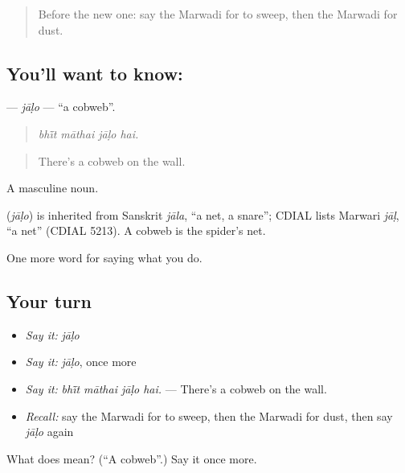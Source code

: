 \begin{quote}
Before the new one: say the Marwadi for to sweep, then the Marwadi for dust.
\end{quote}

\subsection*{You'll want to know: }
\textbf{} — \emph{jāḷo} — \textquotedblleft{}a cobweb\textquotedblright{}.

\begin{quote}
   
\end{quote}

\begin{quote}
\emph{bhī̃t māthai jāḷo hai.}
\end{quote}

\begin{quote}
There's a cobweb on the wall.
\end{quote}

A masculine noun.

\begin{cousinweb}
\textbf{} (\emph{jāḷo}) is inherited from Sanskrit \emph{jāla}, \textquotedblleft{}a net, a snare\textquotedblright{}; CDIAL lists Marwari \emph{jāḷ}, \textquotedblleft{}a net\textquotedblright{} (CDIAL 5213). A cobweb is the spider's net.
\end{cousinweb}

\begin{grammarlens}[title={What you've built}]
One more word for saying what you do.
\end{grammarlens}

\subsection*{Your turn}
\begin{itemize}
\raggedright
  \item \emph{Say it:} \emph{jāḷo}
  \item \emph{Say it:} \emph{jāḷo}, once more
  \item \emph{Say it:} \emph{bhī̃t māthai jāḷo hai.} — There's a cobweb on the wall.
  \item \emph{Recall:} say the Marwadi for to sweep, then the Marwadi for dust, then say \emph{jāḷo} again
\end{itemize}

\begin{tcolorbox}[breakable,colback=teal!4,colframe=teal!35!black,title={Before you move on}]
What does  mean? (\textquotedblleft{}A cobweb\textquotedblright{}.) Say it once more.
\end{tcolorbox}
